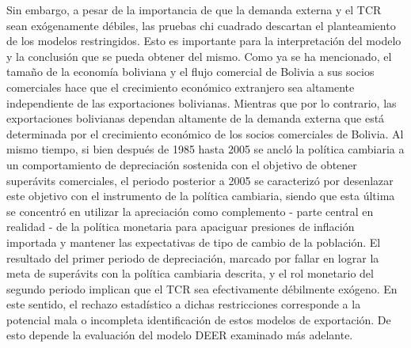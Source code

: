 \documentclass[12pt,letterpaper]{article}
\begin{document}
Sin embargo, a pesar de la importancia de que la demanda externa y el TCR sean exógenamente débiles, las pruebas chi cuadrado descartan el planteamiento de los modelos restringidos. Esto es importante para la interpretación del modelo y la conclusión que se pueda obtener del mismo. Como ya se ha mencionado, el tamaño de la economía boliviana y el flujo comercial de Bolivia a sus socios comerciales hace que el crecimiento económico extranjero sea altamente independiente de las exportaciones bolivianas. Mientras que por lo contrario, las exportaciones bolivianas dependan altamente de la demanda externa que está determinada por el crecimiento económico de los socios comerciales de Bolivia. Al mismo tiempo, si bien después de 1985 hasta 2005 se ancló la política cambiaria a un comportamiento de depreciación sostenida con el objetivo de obtener superávits comerciales, el periodo posterior a 2005 se caracterizó por desenlazar este objetivo con el instrumento de la política cambiaria, siendo que esta última se concentró en utilizar la apreciación como complemento - parte central en realidad - de la política monetaria para apaciguar presiones de inflación importada y mantener las expectativas de tipo de cambio de la población. El resultado del primer periodo de depreciación, marcado por fallar en lograr la meta de superávits con la política cambiaria descrita, y el rol monetario del segundo periodo implican que el TCR sea efectivamente débilmente exógeno. En este sentido, el rechazo estadístico a dichas restricciones corresponde a la potencial mala o incompleta identificación de estos modelos de exportación. De esto depende la evaluación del modelo DEER examinado más adelante.
\end{document}

